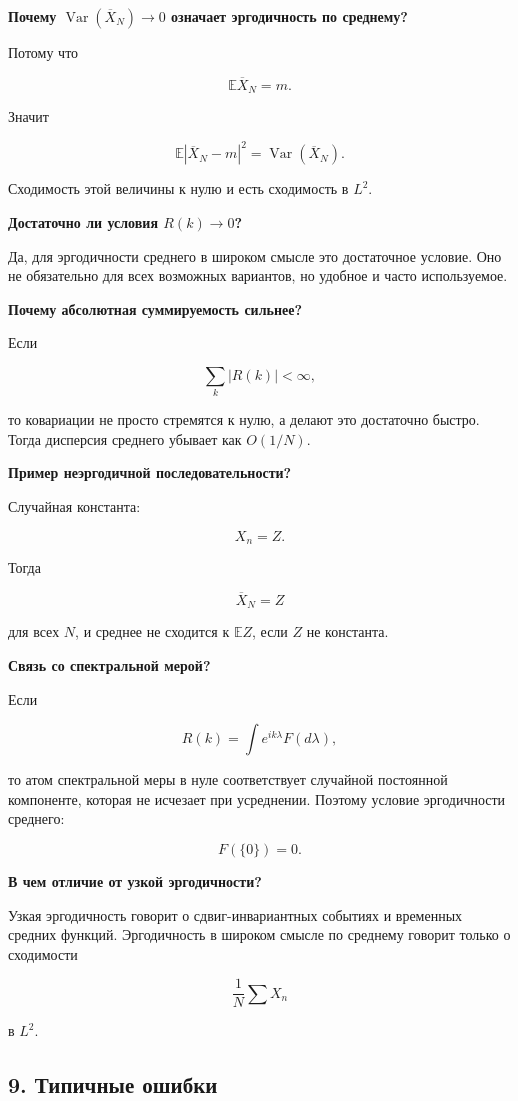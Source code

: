 \documentclass[
  11pt,
  a4paper,
]{article}
\begin{document}
\textbf{Почему \(\operatorname{Var}(\overline X_N)\to0\) означает
эргодичность по среднему?}

Потому что

\[
\mathbb E\overline X_N=m.
\]

Значит

\[
\mathbb E|\overline X_N-m|^2
=
\operatorname{Var}(\overline X_N).
\]

Сходимость этой величины к нулю и есть сходимость в \(L^2\).

\textbf{Достаточно ли условия \(R(k)\to0\)?}

Да, для эргодичности среднего в широком смысле это достаточное условие.
Оно не обязательно для всех возможных вариантов, но удобное и часто
используемое.

\textbf{Почему абсолютная суммируемость сильнее?}

Если

\[
\sum_k|R(k)|<\infty,
\]

то ковариации не просто стремятся к нулю, а делают это достаточно
быстро. Тогда дисперсия среднего убывает как \(O(1/N)\).

\textbf{Пример неэргодичной последовательности?}

Случайная константа:

\[
X_n=Z.
\]

Тогда

\[
\overline X_N=Z
\]

для всех \(N\), и среднее не сходится к \(\mathbb EZ\), если \(Z\) не
константа.

\textbf{Связь со спектральной мерой?}

Если

\[
R(k)=\int e^{ik\lambda}F(d\lambda),
\]

то атом спектральной меры в нуле соответствует случайной постоянной
компоненте, которая не исчезает при усреднении. Поэтому условие
эргодичности среднего:

\[
F(\{0\})=0.
\]

\textbf{В чем отличие от узкой эргодичности?}

Узкая эргодичность говорит о сдвиг-инвариантных событиях и временных
средних функций. Эргодичность в широком смысле по среднему говорит
только о сходимости

\[
\frac1N\sum X_n
\]

в \(L^2\).

\subsection{9. Типичные
ошибки}\label{ux442ux438ux43fux438ux447ux43dux44bux435-ux43eux448ux438ux431ux43aux438}
\end{document}
